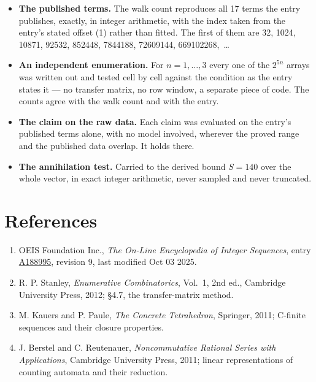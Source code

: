 \documentclass[11pt]{article}
\theoremstyle{definition}
\begin{document}
\begin{itemize}

\item {\bfseries The published terms.} The walk count reproduces all 17 terms the entry publishes, exactly, in integer arithmetic, with the index taken from the entry's stated offset (1) rather than fitted. The first of them are 32, 1024, 10871, 92532, 852448, 7844188, 72609144, 669102268,~\dots

\item {\bfseries An independent enumeration.} For $n = 1,\dots,3$ every one of the $2^{5n}$ arrays was written out and tested cell by cell against the condition as the entry states it --- no transfer matrix, no row window, a separate piece of code. The counts agree with the walk count and with the entry.

\item {\bfseries The claim on the raw data.} Each claim was evaluated on the entry's published terms alone, with no model involved, wherever the proved range and the published data overlap. It holds there.

\item {\bfseries The annihilation test.} Carried to the derived bound $S = 140$ over the whole vector, in exact integer arithmetic, never sampled and never truncated.

\end{itemize}

\section{References}

\begin{enumerate}

\item OEIS Foundation Inc., \emph{The On-Line Encyclopedia of Integer Sequences}, entry \href{https://oeis.org/A188995}{A188995}, revision 9, last modified Oct 03 2025.

\item R. P. Stanley, \emph{Enumerative Combinatorics}, Vol.~1, 2nd ed., Cambridge University Press, 2012; \S4.7, the transfer-matrix method.

\item M. Kauers and P. Paule, \emph{The Concrete Tetrahedron}, Springer, 2011; C-finite sequences and their closure properties.

\item J. Berstel and C. Reutenauer, \emph{Noncommutative Rational Series with Applications}, Cambridge University Press, 2011; linear representations of counting automata and their reduction.

\end{enumerate}
\end{document}
